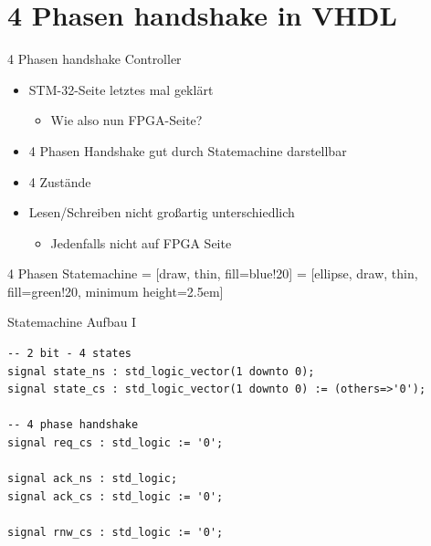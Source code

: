 \documentclass[aspectratio=169,presentation]{beamer}
\begin{document}
\section{4 Phasen handshake in VHDL}
\begin{frame} {4 Phasen handshake Controller}
  \begin{itemize}
    \item STM-32-Seite letztes mal geklärt
    \begin{itemize}
      \item Wie also nun FPGA-Seite?
    \end{itemize}
    \item 4 Phasen Handshake gut durch Statemachine darstellbar
    \item 4 Zustände
    \item Lesen/Schreiben nicht großartig unterschiedlich
    \begin{itemize}
      \item Jedenfalls nicht auf FPGA Seite
    \end{itemize}
  \end{itemize}
\end{frame}


\begin{frame} {4 Phasen Statemachine}
   = [draw, thin, fill=blue!20]
   = [ellipse, draw, thin, fill=green!20, minimum height=2.5em]
  
  \begin{center}
    \begin{figure}
    \end{figure}
  \end{center}
\end{frame}




\begin{frame} [fragile] {Statemachine Aufbau I}
  \begin{lstlisting}
-- 2 bit - 4 states
signal state_ns : std_logic_vector(1 downto 0);
signal state_cs : std_logic_vector(1 downto 0) := (others=>'0');

-- 4 phase handshake 
signal req_cs : std_logic := '0';

signal ack_ns : std_logic;
signal ack_cs : std_logic := '0';

signal rnw_cs : std_logic := '0';
  \end{lstlisting}
\end{frame}
\end{document}
